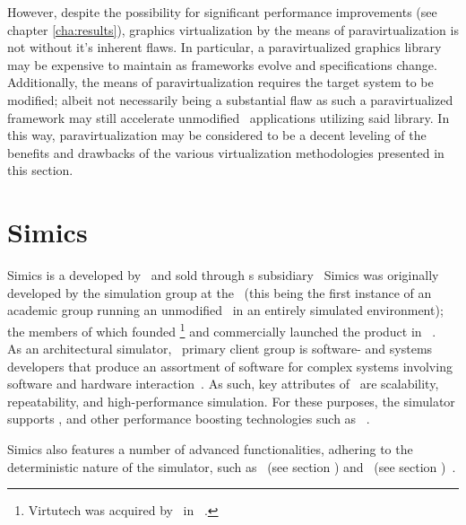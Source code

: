 However, despite the possibility for significant performance improvements (see chapter \ref{cha:results}), graphics virtualization by the means of paravirtualization is not without it's inherent flaws.
In particular, a paravirtualized graphics library may be expensive to maintain as frameworks evolve and specifications change.
Additionally, the means of paravirtualization requires the target system to be modified; albeit not necessarily being a substantial flaw as such a paravirtualized framework may still accelerate unmodified \dvttermtarget\ applications utilizing said library.
In this way, paravirtualization may be considered to be a decent leveling of the benefits and drawbacks of the various virtualization methodologies presented in this section.


\section{Simics}
\label{sec:background_simics}
Simics is a  developed by \dvttermintel\ and sold through \dvttermintel s subsidiary \dvttermwindriver\
Simics was originally developed by the simulation group at the \dvttermsics\ (this being the first instance of an academic group running an unmodified \dvttermos\ in an entirely simulated environment); the members of which founded \dvttermvirtutech \footnote{Virtutech was acquired by \dvttermintel\ in ~.} and commercially launched the product in ~.\\

\noindent
As an architectural simulator, \dvttermsimics\ primary client group is software- and systems developers that produce an assortment of software for complex systems involving software and hardware interaction~.
As such, key attributes of \dvttermsimics\ are scalability, repeatability, and high-performance simulation.
For these purposes, the simulator supports \dvttermhostvirtualizationextensions , and other performance boosting technologies such as \dvttermhypersimulation ~.

Simics also features a number of advanced functionalities, adhering to the deterministic nature of the simulator, such as \dvttermcheckpointing\ (see section ) and \dvttermreverseexecution\ (see section )~.\\

